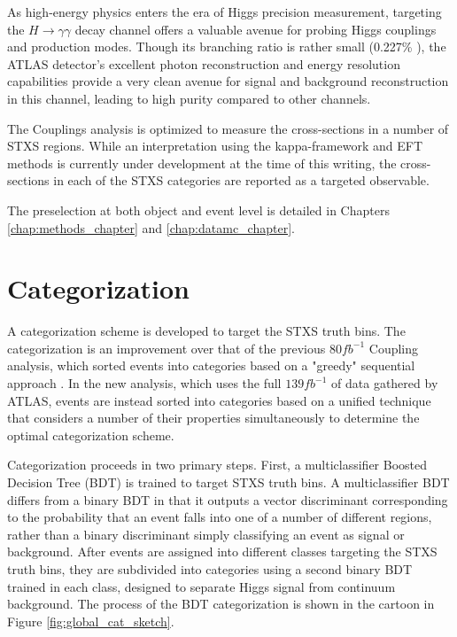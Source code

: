 
As high-energy physics enters the era of Higgs precision measurement, targeting the $H \rightarrow \gamma \gamma$ decay channel offers a valuable avenue for probing Higgs couplings and production modes. Though its branching ratio is rather small (0.227\% \cite{YellowReport4}), the ATLAS detector's excellent photon reconstruction and energy resolution capabilities provide a very clean avenue for signal and background reconstruction in this channel, leading to high purity compared to other channels.

The Couplings analysis is optimized to measure the cross-sections in a number of STXS regions. While an interpretation using the kappa-framework and EFT methods is currently under development at the time of this writing, the cross-sections in each of the STXS categories are reported as a targeted observable.

The preselection at both object and event level is detailed in Chapters \ref{chap:methods_chapter} and \ref{chap:datamc_chapter}.

\section{Categorization} \label{sec:Categorization} 

A categorization scheme is developed to target the STXS truth bins. The categorization is an improvement over that of the previous $80 fb^{-1}$ Coupling analysis, which sorted events into categories based on a "greedy" sequential approach \cite{couplings80fb}. In the new analysis, which uses the full $139 fb^{-1}$ of data gathered by ATLAS, events are instead sorted into categories based on a unified technique that considers a number of their properties simultaneously to determine the optimal categorization scheme.

Categorization proceeds in two primary steps. First, a multiclassifier Boosted Decision Tree (BDT) is trained to target STXS truth bins. A multiclassifier BDT differs from a binary BDT in that it outputs a vector discriminant corresponding to the probability that an event falls into one of a number of different regions, rather than a binary discriminant simply classifying an event as signal or background. After events are assigned into different classes targeting the STXS truth bins, they are subdivided into categories using a second binary BDT trained in each class, designed to separate Higgs signal from continuum background. The process of the BDT categorization is shown in the cartoon in Figure \ref{fig:global_cat_sketch}.

